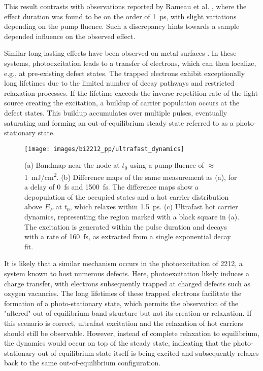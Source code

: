 This result contrasts with observations reported by Rameau et al. \cite{rameau_photoinduced_2014}, where the effect duration was found to be on the order of \qty{1}{\pico\second}, with slight variations depending on the pump fluence.
Such a discrepancy hints towards a sample depended influence on the observed effect.

Similar long-lasting effects have been observed on metal surfaces \cite{bovensiepen_dynamic_2009, gierster_ultrafast_2021, aeschlimann_time-resolved_2025}.
In these systems, photoexcitation leads to a transfer of electrons, which can then localize, e.g., at pre-existing defect states.
The trapped electrons exhibit exceptionally long lifetimes due to the limited number of decay pathways and restricted relaxation processes.
If the lifetime exceeds the inverse repetition rate of the light source creating the excitation, a buildup of carrier population occurs at the defect states.
This buildup accumulates over multiple pulses, eventually saturating and forming an out-of-equilibrium steady state referred to as a photo-stationary state.

\begin{figure}[b!]
	\centering
	\texttt{[image: images/bi2212\_pp/ultrafast\_dynamics]}
	\caption{(a) Bandmap near the node at $t_0$ using a pump fluence of $\approx$\qty{1}{\milli\joule/\centi\meter\squared}. (b) Difference maps of the same measurement as (a), for a delay of \qty{0}{\femto\second} and \qty{1500}{\femto\second}. The difference maps show a depopulation of the occupied states and a hot carrier distribution above $E_F$ at $t_0$, which relaxes within \qty{1.5}{\pico\second}. (c) Ultrafast hot carrier dynamics, representing the region marked with a black square in (a). The excitation is generated within the pulse duration and decays with a rate of \qty{160}{\femto\second}, as extracted from a single exponential decay fit.}
	\label{fig:ultrafast_dyn}
\end{figure}

It is likely that a similar mechanism occurs in the photoexcitation of 2212, a system known to host numerous defects.
Here, photoexcitation likely induces a charge transfer, with electrons subsequently trapped at charged defects such as oxygen vacancies.
The long lifetimes of these trapped electrons facilitate the formation of a photo-stationary state, which permits the observation of the "altered" out-of-equilibrium band structure but not its creation or relaxation.
If this scenario is correct, ultrafast excitation and the relaxation of hot carriers should still be observable.
However, instead of complete relaxation to equilibrium, the dynamics would occur on top of the steady state, indicating that the photo-stationary out-of-equilibrium state itself is being excited and subsequently relaxes back to the same out-of-equilibrium configuration.

